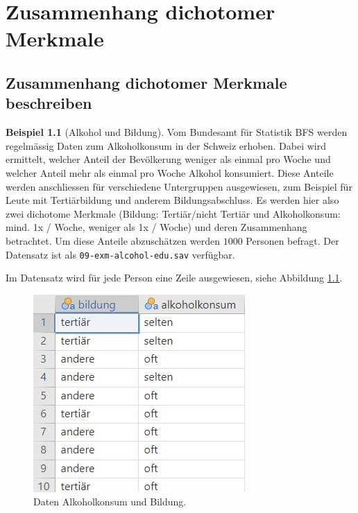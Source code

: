 \documentclass[
]{book}
\theoremstyle{definition}
\theoremstyle{definition}
\newtheorem{example}{Beispiel}[chapter]
\theoremstyle{definition}
\theoremstyle{definition}
\theoremstyle{remark}
\begin{document}
\chapter{Zusammenhang dichotomer Merkmale}\label{vierfelder}

\section{Zusammenhang dichotomer Merkmale beschreiben}\label{zusammenhang-dichotomer-merkmale-beschreiben}

\begin{example}[Alkohol und Bildung]
\protect\hypertarget{exm:alcohol-edu}{}\label{exm:alcohol-edu}Vom Bundesamt für Statistik BFS werden regelmässig Daten zum
Alkoholkonsum in der Schweiz erhoben. Dabei wird ermittelt, welcher
Anteil der Bevölkerung weniger als einmal pro Woche und welcher Anteil
mehr als einmal pro Woche Alkohol konsumiert. Diese Anteile werden
anschliessen für verschiedene Untergruppen ausgewiesen, zum Beispiel für
Leute mit Tertiärbildung und anderem Bildungsabschluss. Es werden hier
also zwei dichotome Merkmale (Bildung: Tertiär/nicht Tertiär und
Alkoholkonsum: mind. 1x / Woche, weniger als 1x / Woche) und deren
Zusammenhang betrachtet. Um diese Anteile abzuschätzen werden
\(1000\) Personen befragt. Der Datensatz ist als \texttt{09-exm-alcohol-edu.sav} verfügbar.
\end{example}

Im Datensatz wird für jede Person eine Zeile ausgewiesen, siehe
Abbildung \ref{fig:exm-alcohol-edu-data-view}.

\begin{figure}

{\centering \includegraphics[width=0.5\linewidth]{figures/09-exm-alcohol-edu-data-view} 

}

\caption{Daten Alkoholkonsum und Bildung.}\label{fig:exm-alcohol-edu-data-view}
\end{figure}
\end{document}
